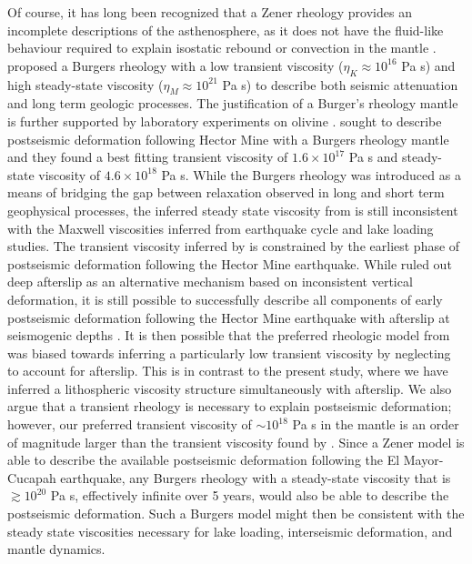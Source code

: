 \documentclass[review]{elsarticle}
\begin{document}
Of course, it has long been recognized that a Zener rheology provides an incomplete descriptions of the asthenosphere, as it does not have the fluid-like behaviour required to explain isostatic rebound or convection in the mantle \citep{OConnell1971}.  \citet{Yuen1982} proposed a Burgers rheology with a low transient viscosity ($\eta_K\approx10^{16}$ Pa s) and high steady-state viscosity ($\eta_M\approx10^{21}$ Pa s) to describe both seismic attenuation and long term geologic processes.  The justification of a Burger's rheology mantle is further supported by laboratory experiments on olivine \citep{Chopra1997}.  \citet{Pollitz2003} sought to describe postseismic deformation following Hector Mine with a Burgers rheology mantle and they found a best fitting transient viscosity of $1.6\times10^{17}$ Pa s and steady-state viscosity of $4.6\times10^{18}$ Pa s. While the Burgers rheology was introduced as a means of bridging the gap between relaxation observed in long and short term geophysical processes, the inferred steady state viscosity from \citet{Pollitz2003} is still inconsistent with the Maxwell viscosities inferred from earthquake cycle and lake loading studies.  The transient viscosity inferred by \citet{Pollitz2003} is constrained by the earliest phase of postseismic deformation following the Hector Mine earthquake. While \citet{Pollitz2003} ruled out deep afterslip as an alternative mechanism based on inconsistent vertical deformation, it is still possible to successfully describe all components of early postseismic deformation following the Hector Mine earthquake with afterslip at seismogenic depths \citep{Jacobs2002}. It is then possible that the preferred rheologic model from \citet{Pollitz2003} was biased towards inferring a particularly low transient viscosity by neglecting to account for afterslip.  This is in contrast to the present study, where we have inferred a lithospheric viscosity structure simultaneously with afterslip.  We also argue that a transient rheology is necessary to explain postseismic deformation; however, our preferred transient viscosity of $\sim10^{18}$ Pa s in the mantle is an order of magnitude larger than the transient viscosity found by \citet{Pollitz2003}.  Since a Zener model is able to describe the available postseismic deformation following the El Mayor-Cucapah earthquake, any Burgers rheology with a steady-state viscosity that is $\gtrsim10^{20}$ Pa s, effectively infinite over 5 years, would also be able to describe the postseismic deformation. Such a Burgers model might then be consistent with the steady state viscosities necessary for lake loading, interseismic deformation, and mantle dynamics.
\end{document}
